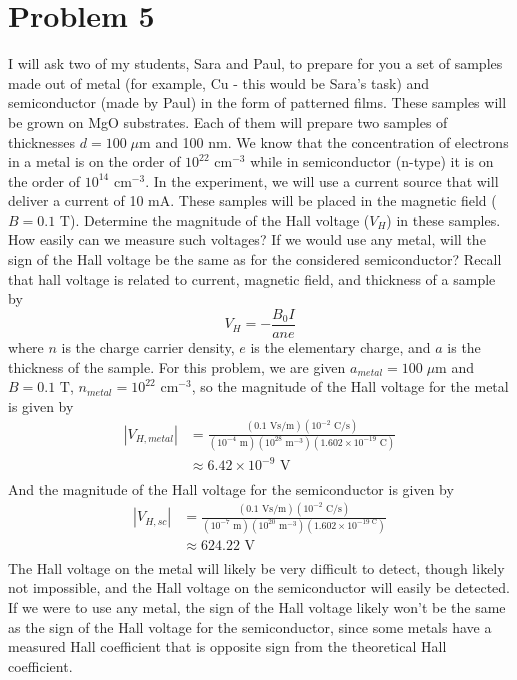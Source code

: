 \documentclass{article}
\begin{document}
\section*{Problem 5}
I will ask two of my students, Sara and Paul, to prepare for you a set of samples made out of metal (for example, Cu - this would be Sara's task) and semiconductor (made by Paul) in the form of patterned films. These samples will be grown on MgO substrates. Each of them will prepare two samples of thicknesses $d = 100 \; \mu\text{m}$ and 100 nm. We know that the concentration of electrons in a metal is on the order of $10^{22} \text{ cm}^{-3}$ while in semiconductor (n-type) it is on the order of $10^{14} \text{ cm}^{-3}$. In the experiment, we will use a current source that will deliver a current of 10 mA. These samples will be placed in the magnetic field ($B = 0.1 \text{ T}$). Determine the magnitude of the Hall voltage ($V_H$) in these samples. How easily can we measure such voltages? If we would use any metal, will the sign of the Hall voltage be the same as for the considered semiconductor?
\newline\newline
Recall that hall voltage is related to current, magnetic field, and thickness of a sample by
\[V_H = -\frac{B_0I}{ane}\]
where $n$ is the charge carrier density, $e$ is the elementary charge, and $a$ is the thickness of the sample. For this problem, we are given $a_{metal} = 100 \; \mu\text{m}$ and $B = 0.1 \text{ T}$, $n_{metal} = 10^{22} \text{ cm}^{-3}$, so the magnitude of the Hall voltage for the metal is given by
\begin{align*}
    |V_{H,metal}| &= \frac{(0.1 \text{ Vs/m})(10^{-2} \text{ C/s})}{(10^{-4} \text{ m})(10^{28} \text{ m}^{-3})(1.602 \times 10^{-19} \text{ C})} \\
    &\approx 6.42 \times 10^{-9} \text{ V} \\
\end{align*}
And the magnitude of the Hall voltage for the semiconductor is given by
\begin{align*}
    |V_{H,sc}| &= \frac{(0.1 \text{ Vs/m})(10^{-2} \text{ C/s})}{(10^{-7} \text{ m})(10^{20} \text{ m}^{-3})(1.602\times 10^{-19 \text{ C}})} \\
    &\approx 624.22 \text{ V} \\
\end{align*}
The Hall voltage on the metal will likely be very difficult to detect, though likely not impossible, and the Hall voltage on the semiconductor will easily be detected. If we were to use any metal, the sign of the Hall voltage likely won't be the same as the sign of the Hall voltage for the semiconductor, since some metals have a measured Hall coefficient that is opposite sign from the theoretical Hall coefficient.
\end{document}
